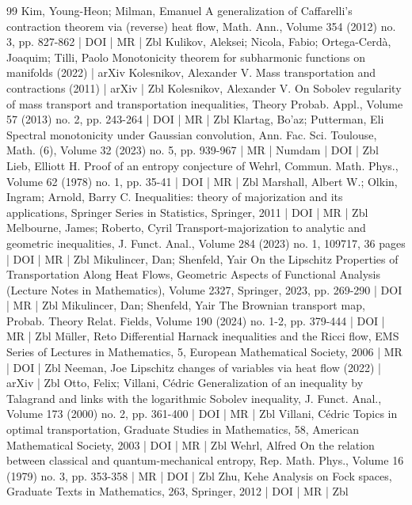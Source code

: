\documentclass[10pt]{amsart}
\theoremstyle{definition}\newtheorem{defi}[theo]{Definition}\newtheorem{rema}[theo]{Remark}\newtheorem{exam}[theo]{Example}\newtheorem{exem}[theo]{Example}\newtheorem{nota}[theo]{Notation}
\begin{document}
\begin{thebibliography}{99}
 Kim, Young-Heon; Milman, Emanuel A generalization of Caffarelli’s contraction theorem via (reverse) heat flow, Math. Ann., Volume 354 (2012) no. 3, pp. 827-862 | DOI | MR | Zbl
 Kulikov, Aleksei; Nicola, Fabio; Ortega-Cerdà, Joaquim; Tilli, Paolo Monotonicity theorem for subharmonic functions on manifolds (2022) | arXiv
 Kolesnikov, Alexander V. Mass transportation and contractions (2011) | arXiv | Zbl
 Kolesnikov, Alexander V. On Sobolev regularity of mass transport and transportation inequalities, Theory Probab. Appl., Volume 57 (2013) no. 2, pp. 243-264 | DOI | MR | Zbl
 Klartag, Bo’az; Putterman, Eli Spectral monotonicity under Gaussian convolution, Ann. Fac. Sci. Toulouse, Math. (6), Volume 32 (2023) no. 5, pp. 939-967 | MR | Numdam | DOI | Zbl
 Lieb, Elliott H. Proof of an entropy conjecture of Wehrl, Commun. Math. Phys., Volume 62 (1978) no. 1, pp. 35-41 | DOI | MR | Zbl
 Marshall, Albert W.; Olkin, Ingram; Arnold, Barry C. Inequalities: theory of majorization and its applications, Springer Series in Statistics, Springer, 2011 | DOI | MR | Zbl
 Melbourne, James; Roberto, Cyril Transport-majorization to analytic and geometric inequalities, J. Funct. Anal., Volume 284 (2023) no. 1, 109717, 36 pages | DOI | MR | Zbl
 Mikulincer, Dan; Shenfeld, Yair On the Lipschitz Properties of Transportation Along Heat Flows, Geometric Aspects of Functional Analysis (Lecture Notes in Mathematics), Volume 2327, Springer, 2023, pp. 269-290 | DOI | MR | Zbl
 Mikulincer, Dan; Shenfeld, Yair The Brownian transport map, Probab. Theory Relat. Fields, Volume 190 (2024) no. 1-2, pp. 379-444 | DOI | MR | Zbl
 Müller, Reto Differential Harnack inequalities and the Ricci flow, EMS Series of Lectures in Mathematics, 5, European Mathematical Society, 2006 | MR | DOI | Zbl
 Neeman, Joe Lipschitz changes of variables via heat flow (2022) | arXiv | Zbl
 Otto, Felix; Villani, Cédric Generalization of an inequality by Talagrand and links with the logarithmic Sobolev inequality, J. Funct. Anal., Volume 173 (2000) no. 2, pp. 361-400 | DOI | MR | Zbl
 Villani, Cédric Topics in optimal transportation, Graduate Studies in Mathematics, 58, American Mathematical Society, 2003 | DOI | MR | Zbl
 Wehrl, Alfred On the relation between classical and quantum-mechanical entropy, Rep. Math. Phys., Volume 16 (1979) no. 3, pp. 353-358 | MR | DOI | Zbl
 Zhu, Kehe Analysis on Fock spaces, Graduate Texts in Mathematics, 263, Springer, 2012 | DOI | MR | Zbl
\end{thebibliography}
\end{document}
